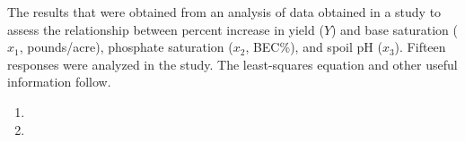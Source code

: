 The results that were obtained from an analysis of data obtained in a study to assess the relationship between percent increase in yield ($Y$) and base saturation ($x_1$, pounds/acre), phosphate saturation ($x_2$, BEC\%), and spoil pH ($x_3$). Fifteen responses were analyzed in the study. The least-squares equation and other useful information follow.

\begin{enumerate}[label={(\alph*)}]
    \item \vspace{.5in}
    \item 
\end{enumerate}